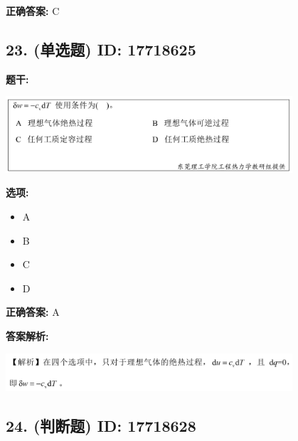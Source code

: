 \documentclass[12pt]{article}
\begin{document}
\textbf{正确答案:}
C

\vspace{0.5em}\hrulefill\vspace{1em}

\subsection*{23. (单选题) \small ID: 17718625}

\textbf{题干:}


\begin{center}\includegraphics[width=0.8\textwidth, height=0.25\textheight, keepaspectratio]{question_23_17718625/title_img_1.png}\end{center}

\textbf{选项:}
\begin{itemize}[leftmargin=*]
  \item A

  \item B

  \item C

  \item D

\end{itemize}

\textbf{正确答案:}
A

\textbf{答案解析:}


\begin{center}\includegraphics[width=0.8\textwidth, height=0.25\textheight, keepaspectratio]{question_23_17718625/correct_replay_img_1.png}\end{center}

\vspace{0.5em}\hrulefill\vspace{1em}

\subsection*{24. (判断题) \small ID: 17718628}
\end{document}
